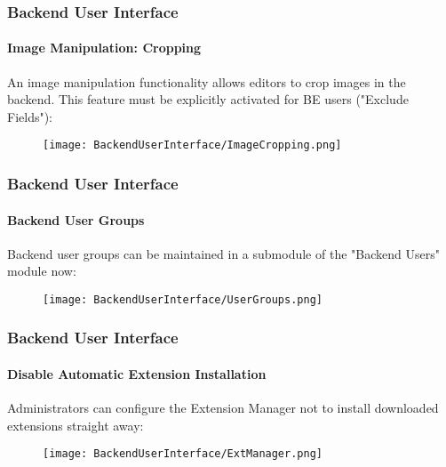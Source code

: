 \begin{frame}[fragile]
	\frametitle{Backend User Interface}
	\framesubtitle{Image Manipulation: Cropping}

	An image manipulation functionality allows editors to crop images in the backend.
	This feature must be explicitly activated for BE users ("Exclude Fields"):

	\begin{figure}
		\texttt{[image: BackendUserInterface/ImageCropping.png]}
	\end{figure}

\end{frame}

\begin{frame}[fragile]
	\frametitle{Backend User Interface}
	\framesubtitle{Backend User Groups}

	Backend user groups can be maintained in a submodule of the "Backend Users" module now:

	\begin{figure}
		\texttt{[image: BackendUserInterface/UserGroups.png]}
	\end{figure}

\end{frame}

\begin{frame}[fragile]
	\frametitle{Backend User Interface}
	\framesubtitle{Disable Automatic Extension Installation}

	Administrators can configure the Extension Manager not to install downloaded
	extensions straight away:

	\begin{figure}
		\texttt{[image: BackendUserInterface/ExtManager.png]}
	\end{figure}

\end{frame}

